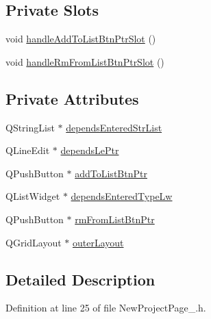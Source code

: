 \subsection*{Private Slots}
\begin{DoxyCompactItemize}
\item 
void \hyperlink{class_new_project_page__4_a8dabef48460abd6e99968c76f7f4d8b6}{handle\-Add\-To\-List\-Btn\-Ptr\-Slot} ()
\item 
void \hyperlink{class_new_project_page__4_a461870b250be86a8464c9c160b007ce0}{handle\-Rm\-From\-List\-Btn\-Ptr\-Slot} ()
\end{DoxyCompactItemize}
\subsection*{Private Attributes}
\begin{DoxyCompactItemize}
\item 
Q\-String\-List $\ast$ \hyperlink{class_new_project_page__4_a1319d6e28b3648b02180579e813ecafb}{depends\-Entered\-Str\-List}
\item 
Q\-Line\-Edit $\ast$ \hyperlink{class_new_project_page__4_a2e6e4ec9aadc2398498d542243b5f9a9}{depends\-Le\-Ptr}
\item 
Q\-Push\-Button $\ast$ \hyperlink{class_new_project_page__4_a66d4547315df8e6207ffeefd779f7e86}{add\-To\-List\-Btn\-Ptr}
\item 
Q\-List\-Widget $\ast$ \hyperlink{class_new_project_page__4_a1cec1dfe07663bca42ba8ce013735d4c}{depends\-Entered\-Type\-Lw}
\item 
Q\-Push\-Button $\ast$ \hyperlink{class_new_project_page__4_adc7e800ceb08846ee3154e309f19542a}{rm\-From\-List\-Btn\-Ptr}
\item 
Q\-Grid\-Layout $\ast$ \hyperlink{class_new_project_page__4_a3e2ba713d9f039382de43a5b362ff3b8}{outer\-Layout}
\end{DoxyCompactItemize}


\subsection{Detailed Description}


Definition at line 25 of file New\-Project\-Page\-\_.\-h.



